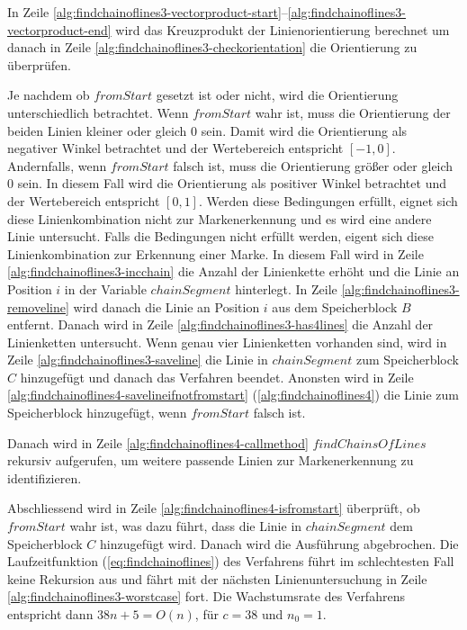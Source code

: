 In Zeile \ref{alg:findchainoflines3-vectorproduct-start}--\ref{alg:findchainoflines3-vectorproduct-end} wird das
 Kreuzprodukt der Linienorientierung berechnet um danach in Zeile \ref{alg:findchainoflines3-checkorientation} die
 Orientierung zu überprüfen.

Je nachdem ob $\mathit{fromStart}$ gesetzt ist oder nicht, wird die Orientierung unterschiedlich betrachtet. Wenn
 $\mathit{fromStart}$ wahr ist, muss die Orientierung der beiden Linien kleiner oder gleich $0$ sein. Damit wird die
 Orientierung als negativer Winkel betrachtet und der Wertebereich entspricht $\left[-1,0\right]$. Andernfalls, wenn
 $\mathit{fromStart}$ falsch ist, muss die Orientierung größer oder gleich $0$ sein. In diesem Fall wird die
 Orientierung als positiver Winkel betrachtet und der Wertebereich entspricht $\left[0,1\right]$. Werden diese
 Bedingungen erfüllt, eignet sich diese Linienkombination nicht zur Markenerkennung und es wird eine andere Linie
 untersucht. Falls die Bedingungen nicht erfüllt werden, eigent sich diese Linienkombination zur Erkennung einer Marke.
 In diesem Fall wird in Zeile \ref{alg:findchainoflines3-incchain} die Anzahl der Linienkette erhöht und die Linie an
 Position $i$ in der Variable $\mathit{chainSegment}$ hinterlegt. In Zeile \ref{alg:findchainoflines3-removeline} wird
 danach die Linie an Position $i$ aus dem Speicherblock $B$ entfernt. Danach wird in Zeile
 \ref{alg:findchainoflines3-has4lines} die Anzahl der Linienketten untersucht. Wenn genau vier Linienketten vorhanden
 sind, wird in Zeile \ref{alg:findchainoflines3-saveline} die Linie in $\mathit{chainSegment}$ zum Speicherblock $C$
 hinzugefügt und danach das Verfahren beendet. Anonsten wird in Zeile
 \ref{alg:findchainoflines4-savelineifnotfromstart} (\autoref{alg:findchainoflines4}) die Linie zum Speicherblock
 hinzugefügt, wenn $\mathit{fromStart}$ falsch ist.

Danach wird in Zeile \ref{alg:findchainoflines4-callmethod} $\mathit{findChainsOfLines}$ rekursiv aufgerufen, um
 weitere passende Linien zur Markenerkennung zu identifizieren.

Abschliessend wird in Zeile \ref{alg:findchainoflines4-isfromstart} überprüft, ob $\mathit{fromStart}$ wahr ist, was
 dazu führt, dass die Linie in $\mathit{chainSegment}$ dem Speicherblock $C$ hinzugefügt wird. Danach wird die
 Ausführung abgebrochen. Die Laufzeitfunktion (\autoref{eq:findchainoflines}) des Verfahrens führt im schlechtesten Fall
 keine Rekursion aus und fährt mit der nächsten Linienuntersuchung in Zeile \ref{alg:findchainoflines3-worstcase} fort.
 Die Wachstumsrate des Verfahrens entspricht dann $38n + 5 = O(n)$, für $c = 38$ und $n_{0} = 1$.


